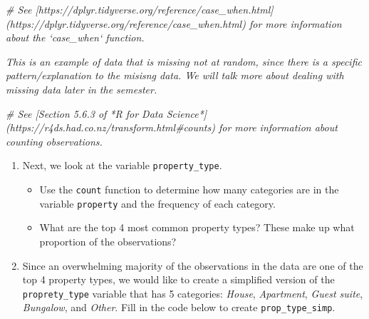 \documentclass[]{book}
\newenvironment{Shaded}{\begin{snugshade}}{\end{snugshade}}
\newcommand{\KeywordTok}[1]{\textcolor[rgb]{0.13,0.29,0.53}{\textbf{#1}}}
\newcommand{\DataTypeTok}[1]{\textcolor[rgb]{0.13,0.29,0.53}{#1}}
\newcommand{\StringTok}[1]{\textcolor[rgb]{0.31,0.60,0.02}{#1}}
\newcommand{\CommentTok}[1]{\textcolor[rgb]{0.56,0.35,0.01}{\textit{#1}}}
\newcommand{\OtherTok}[1]{\textcolor[rgb]{0.56,0.35,0.01}{#1}}
\newcommand{\OperatorTok}[1]{\textcolor[rgb]{0.81,0.36,0.00}{\textbf{#1}}}
\newcommand{\NormalTok}[1]{#1}
\providecommand{\tightlist}{%
  \setlength{\itemsep}{0pt}\setlength{\parskip}{0pt}}
\begin{document}
\begin{Shaded}
\begin{Highlighting}[]
\CommentTok{# See [https://dplyr.tidyverse.org/reference/case_when.html](https://dplyr.tidyverse.org/reference/case_when.html) for more information about the `case_when` function.}
\end{Highlighting}
\end{Shaded}

\begin{Shaded}
\end{Shaded}

\emph{This is an example of data that is missing not at random, since
there is a specific pattern/explanation to the misisng data. We will
talk more about dealing with missing data later in the semester.}

\begin{Shaded}
\begin{Highlighting}[]
\CommentTok{# See [Section 5.6.3 of *R for Data Science*](https://r4ds.had.co.nz/transform.html#counts) for more information about counting observations.}
\end{Highlighting}
\end{Shaded}

\begin{enumerate}
\def\labelenumi{\arabic{enumi}.}
\setcounter{enumi}{5}
\tightlist
\item
  Next, we look at the variable \texttt{property\_type}.

  \begin{itemize}
  \tightlist
  \item
    Use the \texttt{count} function to determine how many categories are
    in the variable \texttt{property} and the frequency of each
    category.
  \item
    What are the top 4 most common property types? These make up what
    proportion of the observations?
  \end{itemize}
\item
  Since an overwhelming majority of the observations in the data are one
  of the top 4 property types, we would like to create a simplified
  version of the \texttt{proprety\_type} variable that has 5 categories:
  \emph{House}, \emph{Apartment}, \emph{Guest suite}, \emph{Bungalow},
  and \emph{Other}. Fill in the code below to create
  \texttt{prop\_type\_simp}.
\end{enumerate}
\end{document}
